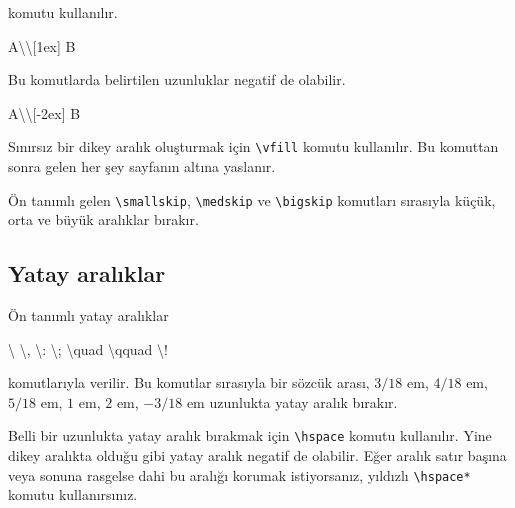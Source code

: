 \documentclass[
  10pt,
]{scrbook}
\newenvironment{Shaded}{\begin{snugshade}}{\end{snugshade}}
\newcommand{\FunctionTok}[1]{\textcolor[rgb]{0.00,0.00,0.00}{#1}}
\newcommand{\NormalTok}[1]{#1}
\theoremstyle{definition}
\theoremstyle{definition}
\theoremstyle{definition}
\theoremstyle{definition}
\theoremstyle{remark}
\begin{document}
komutu kullanılır.

\begin{Shaded}
\begin{Highlighting}[]
\NormalTok{A}\FunctionTok{\textbackslash{}\textbackslash{}}\NormalTok{[1ex]}
\NormalTok{B}
\end{Highlighting}
\end{Shaded}

Bu komutlarda belirtilen uzunluklar negatif de olabilir.

\begin{Shaded}
\begin{Highlighting}[]
\NormalTok{A}\FunctionTok{\textbackslash{}\textbackslash{}}\NormalTok{[{-}2ex]}
\NormalTok{B}
\end{Highlighting}
\end{Shaded}

Sınırsız bir dikey aralık oluşturmak için \texttt{\textbackslash{}vfill} komutu kullanılır. Bu komuttan sonra gelen her şey sayfanın altına yaslanır.

Ön tanımlı gelen \texttt{\textbackslash{}smallskip}, \texttt{\textbackslash{}medskip} ve \texttt{\textbackslash{}bigskip} komutları sırasıyla küçük, orta ve büyük aralıklar bırakır.

\hypertarget{yatay-aralux131klar}{%
\subsection{Yatay aralıklar}\label{yatay-aralux131klar}}

Ön tanımlı yatay aralıklar

\begin{Shaded}
\begin{Highlighting}[]
\FunctionTok{\textbackslash{} } \FunctionTok{\textbackslash{},}  \FunctionTok{\textbackslash{}:}  \FunctionTok{\textbackslash{};}  \FunctionTok{\textbackslash{}quad}  \FunctionTok{\textbackslash{}qquad}  \FunctionTok{\textbackslash{}!}
\end{Highlighting}
\end{Shaded}

komutlarıyla verilir. Bu komutlar sırasıyla bir sözcük arası, \(3/\!18\) em, \(4/\!18\) em, \(5/\!18\) em, \(1\) em, \(2\) em, \(-3/\!18\) em uzunlukta yatay aralık bırakır.

Belli bir uzunlukta yatay aralık bırakmak için \texttt{\textbackslash{}hspace} komutu kullanılır. Yine dikey aralıkta olduğu gibi yatay aralık negatif de olabilir. Eğer aralık satır başına veya sonuna rasgelse dahi bu aralığı korumak istiyorsanız, yıldızlı \texttt{\textbackslash{}hspace*} komutu kullanırsınız.
\end{document}
